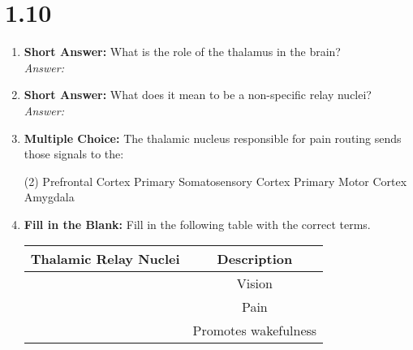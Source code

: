 \section*{1.10}
\begin{enumerate}[label=\textbf{Q1.10.\arabic*}]
      \item \textbf{Short Answer:} What is the role of the thalamus in the brain? \\
            \textit{Answer:} %

      \item \textbf{Short Answer:} What does it mean to be a non-specific relay nuclei? \\
            \textit{Answer:} %

      \item \textbf{Multiple Choice:} The thalamic nucleus responsible for pain routing sends those signals to the:
            \begin{tasks}[label=(\Alph*), label-width=1.5em, item-indent=1.7em](2) %
                  \task Prefrontal Cortex
                  \task Primary Somatosensory Cortex
                  \task Primary Motor Cortex
                  \task Amygdala
            \end{tasks}

      \item \textbf{Fill in the Blank:} Fill in the following table with the correct terms.
      \begin{table}[htbp]
            \centering
            \begin{tabular}{cc}
                  \toprule
                  \textbf{Thalamic Relay Nuclei} & \textbf{Description} \\ \midrule
                  \underline{\hspace{3cm}}       & Vision               \\
                  \underline{\hspace{3cm}}       & Pain                 \\
                  \underline{\hspace{3cm}}       & Promotes wakefulness \\
                  \bottomrule
            \end{tabular}
      \end{table}


\end{enumerate}
